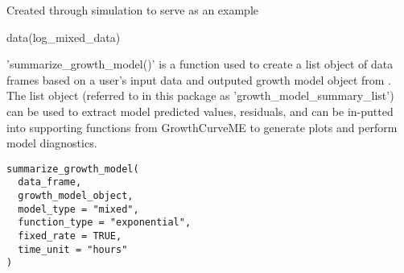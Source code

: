 \documentclass[a4paper]{book}
\begin{document}
%
\begin{Source}
Created through simulation to serve as an example
\end{Source}
%
\begin{Examples}
\begin{ExampleCode}
data(log_mixed_data)
\end{ExampleCode}
\end{Examples}
%
\begin{Description}
'summarize\_growth\_model()' is a function used to create a list object of
data frames based on a user's input data and outputed
growth model object from .
The list object (referred to in this package as 'growth\_model\_summary\_list')
can be used to extract model predicted values, residuals, and can be
in-putted into supporting functions from GrowthCurveME to
generate plots and perform model diagnostics.
\end{Description}
%
\begin{Usage}
\begin{verbatim}
summarize_growth_model(
  data_frame,
  growth_model_object,
  model_type = "mixed",
  function_type = "exponential",
  fixed_rate = TRUE,
  time_unit = "hours"
)
\end{verbatim}
\end{Usage}
%
\end{document}
